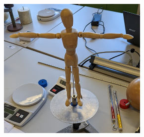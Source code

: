 \begin{figure}
\begin{subfigure}{0.48\textwidth}
      \label{fig:D_Holzpuppe2}
      \includegraphics[width=0.8\textwidth]{content/T_Pose3.jpg}
  \end{subfigure}    
\end{figure}

